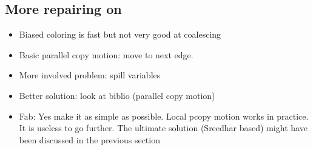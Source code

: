 {\subsection{More repairing on \phifuns}
\begin{itemize}
  \item Biased coloring is fast but not very good at coalescing
  \item Basic parallel copy motion: move to next edge.
  \item More involved problem: spill variables
  \item Better solution: look at biblio (parallel copy motion)
  \item Fab: Yes make it as simple as possible. Local pcopy motion works in practice. It is useless to go further. The ultimate solution (Sreedhar based) might have been discussed in the previous section
\end{itemize}


\endofchapter
}

